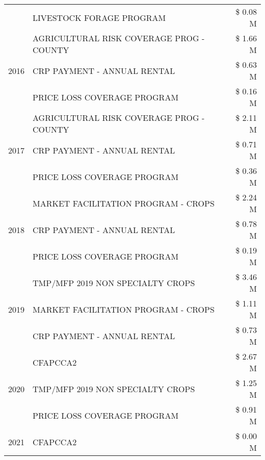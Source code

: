 \begin{tabular}{llr}
 & LIVESTOCK FORAGE PROGRAM & \$ 0.08 M \\
\cline{1-3}
\multirow[t]{3}{*}{2016} & AGRICULTURAL RISK COVERAGE PROG - COUNTY & \$ 1.66 M \\
 & CRP PAYMENT - ANNUAL RENTAL & \$ 0.63 M \\
 & PRICE LOSS COVERAGE PROGRAM & \$ 0.16 M \\
\cline{1-3}
\multirow[t]{3}{*}{2017} & AGRICULTURAL RISK COVERAGE PROG - COUNTY & \$ 2.11 M \\
 & CRP PAYMENT - ANNUAL RENTAL & \$ 0.71 M \\
 & PRICE LOSS COVERAGE PROGRAM & \$ 0.36 M \\
\cline{1-3}
\multirow[t]{3}{*}{2018} & MARKET FACILITATION PROGRAM - CROPS & \$ 2.24 M \\
 & CRP PAYMENT - ANNUAL RENTAL & \$ 0.78 M \\
 & PRICE LOSS COVERAGE PROGRAM & \$ 0.19 M \\
\cline{1-3}
\multirow[t]{3}{*}{2019} & TMP/MFP 2019 NON SPECIALTY CROPS & \$ 3.46 M \\
 & MARKET FACILITATION PROGRAM - CROPS & \$ 1.11 M \\
 & CRP PAYMENT - ANNUAL RENTAL & \$ 0.73 M \\
\cline{1-3}
\multirow[t]{3}{*}{2020} & CFAPCCA2 & \$ 2.67 M \\
 & TMP/MFP 2019 NON SPECIALTY CROPS & \$ 1.25 M \\
 & PRICE LOSS COVERAGE PROGRAM & \$ 0.91 M \\
\cline{1-3}
2021 & CFAPCCA2 & \$ 0.00 M \\
\cline{1-3}
\bottomrule
\end{tabular}
